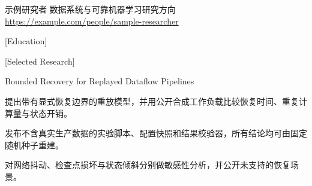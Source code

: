 
\begin{resumeheaderblock}[2]
  {示例研究者}
  {数据系统与可靠机器学习研究方向}
    {}
    {\url{https://example.com/people/sample-researcher}}
\end{resumeheaderblock}

[Education]

\begin{resumegrid}[1][raster equal height=none]
\end{resumegrid}

[Selected Research]

\resumeitemheading
  {Bounded Recovery for Replayed Dataflow Pipelines}
  {}
\begin{resumelist}
  \item 提出带有显式恢复边界的重放模型，并用公开合成工作负载比较恢复时间、重复计算量与状态开销。
  \item 发布不含真实生产数据的实验脚本、配置快照和结果校验器，所有结论均可由固定随机种子重建。
  \item 对网络抖动、检查点损坏与状态倾斜分别做敏感性分析，并公开未支持的恢复场景。
\end{resumelist}

